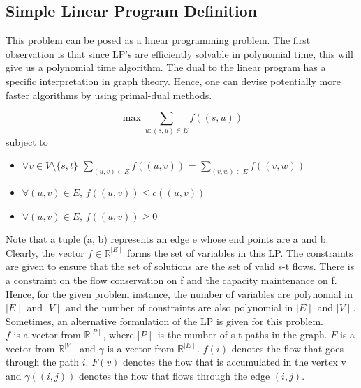 \documentclass[BTech]{iitmdiss}
\begin{document}
	\subsection{Simple Linear Program Definition}
	  This problem can be posed as a linear programming problem. The first observation is that since LP's are efficiently solvable in polynomial
	  time, this will give us a polynomial time algorithm. The dual to the linear
	  program has a specific interpretation in graph theory. Hence, one can devise potentially more faster algorithms by using primal-dual
	  methods.
	  
	  $$\max \displaystyle\sum_{u:(s,u) \in E} f((s,u))$$
	  subject to
	  \begin{itemize}
	   \item
	      $\forall v \in V \setminus \{s,t\}$ $\displaystyle\sum_{(u,v) \in E} f((u,v))$ = $\displaystyle\sum_{(v,w) \in E} f((v,w))$
	   \item
	      $\forall (u,v) \in E$, $f((u,v)) \leq c((u,v))$
	   \item
	      $\forall(u,v) \in E$, $f((u,v)) \geq 0$
	      
	  \end{itemize}
	  
	  Note that a tuple (a, b) represents an edge e whose end points are a and b. \\
	  
	  Clearly, the vector $f \in \mathbb{R}^{\mid E\mid }$ forms the set of variables in this LP. The constraints are given to ensure that the set of 
	  solutions are the set of valid s-t flows. There is a constraint on the flow conservation on f and the capacity maintenance on f. Hence, for the
	  given problem instance, the number of variables are polynomial in $\mid E\mid $ and $\mid V\mid $ and the number of constraints are also polynomial in $\mid E\mid $
	  and $\mid V\mid $. \\
	  
	  Sometimes, an alternative formulation of the LP is given for this problem.\\
	  
	  $f$ is a vector from $\mathbb{R}^{\mid P\mid }$, where $\mid P\mid $ is the number of s-t paths in the graph. $F$ is a vector from $\mathbb{R}^{\mid V\mid }$
	  and $\gamma$ is a vector from $\mathbb{R}^{\mid E\mid }$. $f(i)$ denotes the flow that goes through the path $i$. $F(v)$ denotes the flow that 
	  is accumulated in the vertex v and $\gamma((i,j))$ denotes the flow that flows through the edge $(i,j)$. \\
	  
\end{document}
